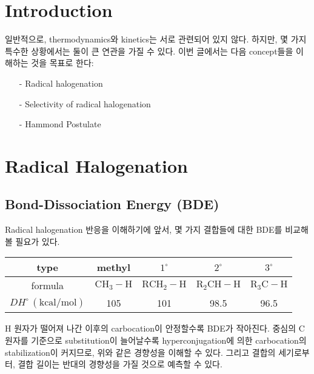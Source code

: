 \documentclass[a4paper, 9pt]{article}
\begin{document}
\section{Introduction}
일반적으로, thermodynamics와 kinetics는 서로 관련되어 있지 않다. 하지만, 몇 가지 특수한 상황에서는 둘이 큰 연관을 가질 수 있다. 이번 글에서는 다음 concept들을 이해하는 것을 목표로 한다:
 \begin{itemize}
 	\item[-] Radical halogenation
 	\item[-] Selectivity of radical halogenation
 	\item[-] Hammond Postulate
 \end{itemize}
 \section{Radical Halogenation}
 \subsection{Bond-Dissociation Energy (BDE)}
 Radical halogenation 반응을 이해하기에 앞서, 몇 가지 결합들에 대한 BDE를 비교해 볼 필요가 있다.
 \begin{center}
 	\begin{tabular}{|c|c|c|c|c|}
 		\hline
 		type & methyl & $1^{\circ}$ & $2^{\circ}$ & $3^{\circ}$\\
 		\hline
 		formula & $\mathrm{CH_{3}-H}$ & $\mathrm{RCH_{2}-H}$ & $\mathrm{R_{2}CH-H}$ & $\mathrm{R_{3}C-H}$ \\
 		\hline
 		$DH^{\circ}\,(\mathrm{kcal/mol})$ & 105 & 101 & 98.5 & 96.5 \\
 		\hline
 	\end{tabular}
 \end{center}
H 원자가 떨어져 나간 이후의 carbocation이 안정할수록 BDE가 작아진다. 중심의 C 원자를 기준으로 substitution이 늘어날수록 hyperconjugation에 의한 carbocation의 stabilization이 커지므로, 위와 같은 경향성을 이해할 수 있다. 그리고 결합의 세기로부터, 결합 길이는 반대의 경향성을 가질 것으로 예측할 수 있다.
\end{document}
